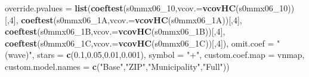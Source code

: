 \documentclass[
]{article}
\newenvironment{Shaded}{\begin{snugshade}}{\end{snugshade}}
\newcommand{\DataTypeTok}[1]{\textcolor[rgb]{0.13,0.29,0.53}{#1}}
\newcommand{\DecValTok}[1]{\textcolor[rgb]{0.00,0.00,0.81}{#1}}
\newcommand{\FloatTok}[1]{\textcolor[rgb]{0.00,0.00,0.81}{#1}}
\newcommand{\KeywordTok}[1]{\textcolor[rgb]{0.13,0.29,0.53}{\textbf{#1}}}
\newcommand{\NormalTok}[1]{#1}
\newcommand{\StringTok}[1]{\textcolor[rgb]{0.31,0.60,0.02}{#1}}
\begin{document}
\begin{Shaded}
\begin{Highlighting}[]
          \DataTypeTok{override.pvalues =} \KeywordTok{list}\NormalTok{(}\KeywordTok{coeftest}\NormalTok{(s0mmx06_}\DecValTok{10}\NormalTok{,}\DataTypeTok{vcov.=}\KeywordTok{vcovHC}\NormalTok{(s0mmx06_}\DecValTok{10}\NormalTok{))[,}\DecValTok{4}\NormalTok{],}
                                  \KeywordTok{coeftest}\NormalTok{(s0mmx06_1A,}\DataTypeTok{vcov.=}\KeywordTok{vcovHC}\NormalTok{(s0mmx06_1A))[,}\DecValTok{4}\NormalTok{],}
                                  \KeywordTok{coeftest}\NormalTok{(s0mmx06_1B,}\DataTypeTok{vcov.=}\KeywordTok{vcovHC}\NormalTok{(s0mmx06_1B))[,}\DecValTok{4}\NormalTok{],}
                                  \KeywordTok{coeftest}\NormalTok{(s0mmx06_1C,}\DataTypeTok{vcov.=}\KeywordTok{vcovHC}\NormalTok{(s0mmx06_1C))[,}\DecValTok{4}\NormalTok{]),}
          \DataTypeTok{omit.coef =} \StringTok{"(wave)"}\NormalTok{, }\DataTypeTok{stars =} \KeywordTok{c}\NormalTok{(}\FloatTok{0.1}\NormalTok{,}\FloatTok{0.05}\NormalTok{,}\FloatTok{0.01}\NormalTok{,}\FloatTok{0.001}\NormalTok{), }\DataTypeTok{symbol =} \StringTok{"+"}\NormalTok{,}
          \DataTypeTok{custom.coef.map =}\NormalTok{ vnmap, }
          \DataTypeTok{custom.model.names =} \KeywordTok{c}\NormalTok{(}\StringTok{"Base"}\NormalTok{,}\StringTok{"ZIP"}\NormalTok{,}\StringTok{"Municipality"}\NormalTok{,}\StringTok{"Full"}\NormalTok{))}
\end{Highlighting}
\end{Shaded}
\end{document}
